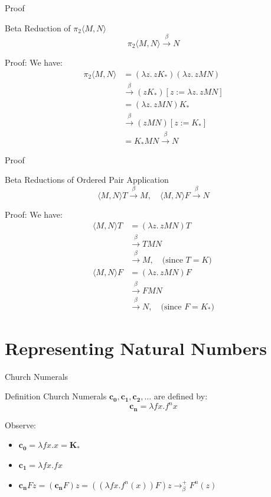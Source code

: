 \documentclass{beamer}
\begin{document}
\begin{frame}{Proof}
  \begin{block}{Beta Reduction of \(\pi_2 \langle M, N \rangle\)}
    \[
      \pi_2 \langle M, N \rangle \xrightarrow{\beta} N
    \]
  \end{block}
  Proof:  
  We have:
  \begin{align*}
    \pi_2 \langle M, N \rangle &= (\lambda z.\, zK_*)(\lambda z.\, z M N) \\
    &\xrightarrow{\beta} (zK_*)[z := \lambda z.\, z M N] \\
    &= (\lambda z.\, z M N)K_* \\
    &\xrightarrow{\beta} (z M N)[z := K_*] \\
    &= K_* M N \xrightarrow{\beta} N
  \end{align*}
\end{frame}
\begin{frame}{Proof}
  \begin{block}{Beta Reductions of Ordered Pair Application}
    \[
      \langle M, N \rangle T \xrightarrow{\beta} M, \quad \langle M, N \rangle F \xrightarrow{\beta} N
    \]
  \end{block}
  Proof:  
  We have:
  \begin{align*}
    \langle M, N \rangle T &= (\lambda z.\, z M N) T \\
    &\xrightarrow{\beta} T M N \\
    &\xrightarrow{\beta} M, \quad \text{(since } T = K \text{)} \\[10pt]
    \langle M, N \rangle F &= (\lambda z.\, z M N) F \\
    &\xrightarrow{\beta} F M N \\
    &\xrightarrow{\beta} N, \quad \text{(since } F = K_* \text{)}
  \end{align*}
\end{frame}

\section{Representing Natural Numbers}
\begin{frame}{Church Numerals}
  \begin{block}{Definition}
    Church Numerals \(\mathbf{c_0,c_1,c_2,\dots}\) are defined by: 
    \[
      \mathbf{c_n} = \lambda fx. f^n x
    \] 
  \end{block}
  Observe:
  \begin{itemize}
    \item \(\mathbf{c_0} = \lambda fx. x = \mathbf{K_*}\)
    \item \(\mathbf{c_1} = \lambda fx. f x\)
    \item \(\mathbf{c_n} Fz = (\mathbf{c_n}F)z = ((\lambda fx.f^n(x))F)z \rightarrow_\beta^+ F^n(z)\)
  \end{itemize}
\end{frame}
\end{document}
